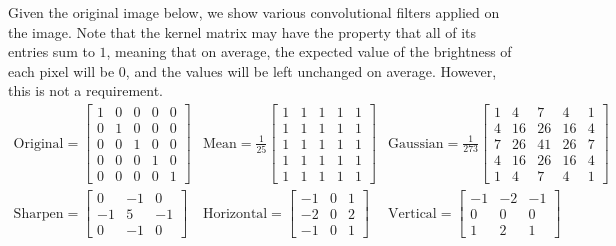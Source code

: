   \begin{example}
    Given the original image below, we show various convolutional filters applied on the image. Note that the kernel matrix may have the property that all of its entries sum to $1$, meaning that on average, the expected value of the brightness of each pixel will be $0$, and the values will be left unchanged on average. However, this is not a requirement.  
    \begin{align*}
      \mathrm{Original} = \begin{bmatrix} 1 & 0 & 0 & 0 & 0 \\ 0 & 1 & 0 & 0 & 0 \\ 0 & 0 & 1 & 0 & 0 \\ 0 & 0 & 0 & 1 & 0 \\ 0 & 0 & 0 & 0 & 1 \end{bmatrix} & 
      \mathrm{Mean} = \frac{1}{25} \begin{bmatrix} 1 & 1 & 1 & 1 & 1 \\ 1 & 1 & 1 & 1 & 1 \\ 1 & 1 & 1 & 1 & 1 \\ 1 & 1 & 1 & 1 & 1 \\ 1 & 1 & 1 & 1 & 1 \end{bmatrix} & 
      \mathrm{Gaussian} = \frac{1}{273} \begin{bmatrix} 1 & 4 & 7 & 4 & 1 \\ 4 & 16 & 26 & 16 & 4 \\ 7 & 26 & 41 & 26 & 7 \\ 4 & 16 & 26 & 16 & 4 \\ 1 & 4 & 7 & 4 & 1 \end{bmatrix} \\   
      \mathrm{Sharpen} = \begin{bmatrix} 0 & -1 & 0 \\ -1 & 5 & -1 \\ 0 & -1 & 0 \end{bmatrix} & 
      \mathrm{Horizontal} = \begin{bmatrix} -1 & 0 & 1 \\ -2 & 0 & 2 \\ -1 & 0 & 1 \end{bmatrix} & 
      \mathrm{Vertical} = \begin{bmatrix} -1 & -2 & -1 \\ 0 & 0 & 0 \\ 1 & 2 & 1 \end{bmatrix} 
    \end{align*}


\end{example}
